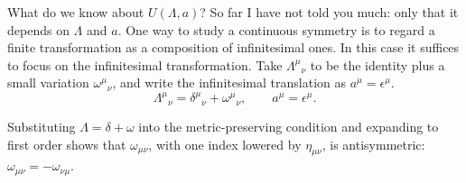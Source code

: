What do we know about $U(\Lambda,a)$? So far I have not told you much: only that
it depends on $\Lambda$ and $a$. One way to
study a continuous symmetry is to regard a finite transformation as a
composition of infinitesimal ones. In this case it suffices to focus
on the infinitesimal transformation. Take $\Lambda^\mu{}_\nu$ to be the identity
plus a
small variation $\omega^\mu{}_\nu$, and write the infinitesimal translation as
$a^\mu=\epsilon^\mu$.
\begin{equation}
  \Lambda^\mu{}_{\nu}=\delta^\mu{}_{\nu}+\omega^\mu{}_{\nu},
  \qquad
  a^\mu=\epsilon^\mu.
  \label{eq:253a-infinitesimal-poincare}
\end{equation}

Substituting $\Lambda=\delta+\omega$ into the metric-preserving condition and
expanding to first order shows that $\omega_{\mu\nu}$, with one index
lowered by $\eta_{\mu\nu}$, is antisymmetric:
$\omega_{\mu\nu}=-\omega_{\nu\mu}$.

